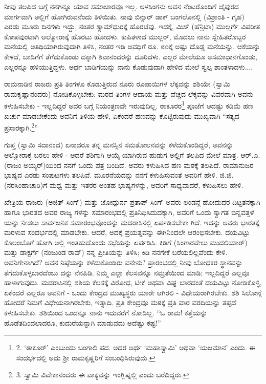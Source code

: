 ನೀವು ತಲಪಿದ ಬಗ್ಗೆ ನನಗಿನ್ನೂ ಯಾವ ಸಮಾಚಾರವೂ ಇಲ್ಲ. ಅಳಸಿಂಗನು ಅವನ ನೆಂಟರೊಂದಿಗೆ ಜೈಪುರದ ಮಾರ್ಗವಾಗಿ ಅಲ್ಲಿಗೆ ಹೋಗಿರುವನೆಂದು ತಿಳಿಯಿತು. ನಾವು ಬಿನ್ಸಾರ್ ಡಾಕ್ ಬಂಗಲೊನಲ್ಲಿ (ವಿಶ್ರಾಂತಿ - ಗೃಹ) ಎರಡು ಮೂರು ದಿನಗಳು ಇದ್ದು, ನಂತರ ಶ್ಯಾಮ್​ಧುರಕ್ಕೆ ಹೊರಟೆವು. ಇದಕ್ಕೆ, ಮಿಸ್ (ಹೆನ್ರಿಟಾ) ಮುಲ್ಲರ್ಗೆ ವಿಪರೀತ ಕೋಪವುಂಟಾಗಿ ಆಲ್ಮೋರಾಕ್ಕೆ ಹೊರಟು ಹೋದಳು. ಕುಪಿತಳಾದ ಮುಲ್ಲರ್, ಮೊದಲು ನಾನು ಸ್ನೇಹಿತರೊಬ್ಬರ ಮನೆಯಲ್ಲಿ ಅತಿಥಿಯಾಗಿರುವುದಾಗಿ ತಿಳಿಸಿ, ನಂತರ ಇಡಿ ಅವಧಿಗೆ ರೂ. ೮೦ಕ್ಕೆ ಅಷ್ಟು ದೊಡ್ಡ ಮನೆಯನ್ನು, ಆಕೆಯನ್ನು ಕೇಳದೆ, ಬಾಡಿಗೆಗೆ ತೆಗೆದುಕೊಂಡು ದಕ್ಕಾಗಿ ಶಿವಾನಂದರನ್ನು ದೂರಿದಳು. ಎಲ್ಲರ ಮೇಲೆಯೂ ಅಸಮಾಧಾನಗೊಂಡು, ಎಲ್ಲರನ್ನೂ ಹಳಿಯುತ್ತಿದ್ದಳು. ಅರ್ಧ ಬಾಡಿಗೆಯನ್ನು ನಾನು ಕೊಡುವುದಾಗಿ ಹೇಳಿದ ಮೇಲೆ ಸ್ವಲ್ಪ ಶಾಂತಳಾದಳು....

ರಾಮನಾಡಿನ ರಾಜರು ಪ್ರತಿ ತಿಂಗಳೂ ಕೊಡುತ್ತಿರುವ ನೂರು ರೂಪಾಯಿಗಳ ಲೆಕ್ಕವನ್ನು ಶಶಿಯೇ (ಸ್ವಾಮಿ ರಾಮಕೃಷ್ಣಾನಂದರು) ನೋಡಿಕೊಳ್ಳಬೇಕು; ಮಠದ ತಿಂಗಳ ಆದಾಯ ಮತ್ತು ವೆಚ್ಚದ ಲೆಕ್ಕವನ್ನು ವಿವರವಾಗಿ ಅವನು ಕಳುಹಿಸಬೇಕು - ಇಲ್ಲದಿದ್ದರೆ ಅದರ ಬಗ್ಗೆ ನಿಯಂತ್ರಣವೇ ಇರುವುದಿಲ್ಲ. ಠಾಕೂರರ\footnote{2. ‘ಠಾಕೂರ್’ ಎಂಬುಂದು ಬಂಗಾಲಿ ಪದ. ಅದರ ಅರ್ಥ ‘ಮಹಾಸ್ವಾಮಿ’ ಅಥವಾ ‘ಯಜಮಾನ’ ಎಂದು. ಈ ಸಂದರ್ಭದಲ್ಲಿ ಅದು ಶ‍್ರೀ ರಾಮಕೃಷ್ಣರಿಗೆ ಸಂಬಂಧಿಸಿರುವುದು.} ಪೂಜೆಗೆ ಆದಷ್ಟು ಕಡಿಮೆ ಹಣ ಖರ್ಚು ಮಾಡಬೇಕೆಂದು ಅವನಿಗೆ ತಿಳಿಯ ಹೇಳಿ, ಏಕೆಂದರೆ ಹಣವನ್ನು ಕೊಟ್ಟಿರುವುದು ಮುಖ್ಯವಾಗಿ “ಸತ್ಯದ ಪ್ರಸಾರಕ್ಕಾಗಿ.\footnote{3. ಸ್ವಾಮಿ ವಿವೇಕಾನಂದರು ಈ ವಾಕ್ಯವನ್ನು ಇಂಗ್ಲಿಷ್ನಲ್ಲಿ  ಎಂದು ಬರೆದಿದ್ದರು.}”

ಗುಪ್ತ (ಸ್ವಾಮಿ ಸದಾನಂದ) ಏನಾದರೂ ತನ್ನ ಮನಸ್ಸಿನ ಸಮತೋಲನವನ್ನು ಕಳೆದುಕೊಂಡಿದ್ದರೆ, ಅವನನ್ನು ಆಲ್ಮೋರಾಕ್ಕೆ ಬರಲು ಹೇಳಿ - ಆದರೆ ಶಶಿಗಾಗಿ ಆಯ್ಕೆ ಯಾಗಿರುವ ಹುಡುಗ ಅಲ್ಲಿಗೆ ತಲಪಿದ ಮೇಲೆ ಮಾತ್ರ. ಆರ್.ಎ. (ರಾಜಂ ಅಯ್ಯರ್)ಯಿಂದ ನನಗೆ ಒಂದು ಪತ್ರ ಬಂದಿದೆ. ಅವರು ಕಳುಹಿಸಿದ ಹಣ ಮಠಕ್ಕೆ ತಲಪಿದೆ. ರಾಮಾನುಜರ ಭಾಷ್ಯದ ಎರಡು ಸಂಪುಟಗಳು ತಲಪಿವೆ. ಮೂರನೆಯದನ್ನು ನನಗೆ ಕಳುಹಿಸುವಂತೆ ಅವರಿಗೆ ಹೇಳಿ. ಜಿ.ಜಿ. (ನರಸಿಂಹಾಚಾರಿ)ಗೆ ಮಧ್ವ ಮತ್ತು ಇತರರ ಅಂತಹ ಭಾಷ್ಯಗಳನ್ನು, ಅವರಿಗೆ ಸಾಧ್ಯವಾದರೆ, ಕಳುಹಿಸಲು ಹೇಳಿ.

ಖೇತ್ರಿಯ ರಾಜರು (ಅಜಿತ್ ಸಿಂಗ್) ಮತ್ತು ಜೋಧ್ಪುರ್ನ ಪ್ರತಾಪ್ ಸಿಂಗ್ ಅವರು ಲಂಡನ್ಗೆ ಹೋದುದರ ದಿಟ್ಟತನಕ್ಕಾಗಿ ಹಾಗೂ ಭಾರತದ ಅವರ ರಾಜ್ಯ ಗಳನ್ನು ಸಮಾರಂಭದಲ್ಲಿ ಪ್ರತಿನಿಧಿಸಿದುದಕ್ಕಾಗಿ, ಅವರಿಗೆ ಒಂದು ಸ್ವಾಗತ ಬಿನ್ನವತ್ತಳೆ ಯನ್ನು ನೀಡಲು ಸಾರ್ವಜನಿಕ ಸಮಾರಂಭವೊಂದನ್ನು ಮದರಾಸಿನಲ್ಲಿ ಏರ್ಪಡಿಸಬೇಕಾ ಗಿದೆ. ಇದನ್ನು ಅವರು ಭಾರತಕ್ಕೆ ಮರಳುವ ಸಂದರ್ಭದಲ್ಲಿ ಮಾಡಬೇಕು. ಆದರೆ, ಅದಕ್ಕೆ ಪ್ರಯತ್ನವನ್ನು ಈಗಿನಿಂದಲೇ ಆರಂಭಿಸಬೇಕು. ದಯವಿಟ್ಟು ಕೊಲಂಬೊಗೆ ಹೋಗಿ ಅಲ್ಲಿ ಇಂತಹುದೊಂದು ಸಭೆಯನ್ನು ಏರ್ಪಡಿಸಿ. ಕಿಡಿಗೆ (ಸಿಂಗಾರವೇಲು ಮುದಲಿಯಾರ್) ಮತ್ತು ಡಾಕ್ಟರ್ಗೆ (ನಂಜುಂಡ ರಾವ್) ನನ್ನ ಪ್ರೀತಿಯನ್ನು ತಿಳಿಸಿ; ಕಿಡಿ ನನಗೇಕೆ ಬರೆಯಲಿಲ್ಲವೆಂದು ಕೇಳಿ. ಅವನಿಗೇನಾಗಿದೆ? ಅವನ ನಿಷ್ಠೆಯನ್ನು ಕಳೆದುಕೊಂಡಿರು ವನೇನು? ಪ್ರಾರಂಭದಲ್ಲಿ ನೀವು ಬೋಧಕರ ಸ್ಥಾನವನ್ನು ತೆಗೆದುಕೊಳ್ಳಬಾರದೆಂಬು ದನ್ನು ನೆನಪಿಡಿ. ನಿಮ್ಮ ಎಲ್ಲಾ ಕೆಲಸವನ್ನೂ ನಮ್ರತೆಯಿಂದ ಮಾಡಿ; ಇಲ್ಲದಿದ್ದರೆ ಎಲ್ಲವೂ ಹಾಳಾಗುವುದು. ಮದರಾಸಿನಲ್ಲಿ ಶಶಿಯ ಕೆಲಸಕ್ಕೆ ವಿರೋಧ, ಟೀಕೆ ಅಥವಾ ವಿಘ್ನ ಬಾರದಂತೆ ದಯವಿಟ್ಟು ನೋಡಿಕೊಳ್ಳಿ, ಏಕೆಂದರೆ ಎಲ್ಲರೂ ಅವನಿಗೆ - ಒಂದು ಕೇಂದ್ರದ ಮುಖ್ಯಸ್ಥರು ಯಾರೇ ಆಗಿರಲಿ - ವಿಧೇಯರಾಗಿರಬೇಕು. ಶಶಿ ಸಿಲೋನ್ಗೆ ಹೋದರೆ ನಿಮಗೆ ವಿಧೇಯನಾಗಿರಬೇಕು, ಇತ್ಯಾದಿ. ಪ್ರತಿ ಕೇಂದ್ರವೂ ಮಠಕ್ಕೆ ಪ್ರತಿ ವಾರ ವರದಿಯನ್ನು ತಪ್ಪದೆ ಕಳುಹಿಸಬೇಕು. ಶಶಿಯಿಂದ ಒಂದನ್ನೂ ನಾನು ಇದುವರೆಗೆ ನೋಡಿಲ್ಲ. “ಓ ರಾಮ! ಕತ್ತೆಯನ್ನು ಹೊಡೆತದಿಂದಲಾದರೂ, ಕುದುರೆಯನ್ನಾಗಿ ಮಾಡುವದು ಅದೆಷ್ಟು ಕಷ್ಟ!”


